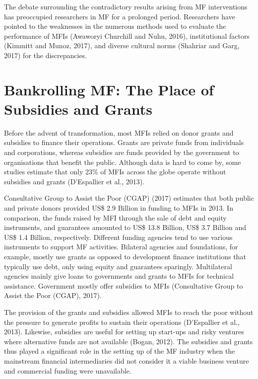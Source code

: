 \documentclass[a4paper, nobind]{templates/ociamthesis}
\begin{document}
The debate surrounding the contradictory results arising from MF interventions has preoccupied researchers in MF for a prolonged period. Researchers have pointed to the weaknesses in the numerous methods used to evaluate the performance of MFIs (Awaworyi Churchill and Nuhu, 2016), institutional factors (Kimmitt and Munoz, 2017), and diverse cultural norms (Shahriar and Garg, 2017) for the discrepancies.

\hypertarget{bankrolling-mf-the-place-of-subsidies-and-grants}{%
\section{Bankrolling MF: The Place of Subsidies and Grants}\label{bankrolling-mf-the-place-of-subsidies-and-grants}}

\noindent Before the advent of transformation, most MFIs relied on donor grants and subsidies to finance their operations. Grants are private funds from individuals and corporations, whereas subsidies are funds provided by the government to organisations that benefit the public. Although data is hard to come by, some studies estimate that only 23\% of MFIs across the globe operate without subsidies and grants (D'Espallier et al., 2013).

Consultative Group to Assist the Poor (CGAP) (2017) estimates that both public and private donors provided US\$ 2.9 Billion in funding to MFIs in 2013. In comparison, the funds raised by MFI through the sale of debt and equity instruments, and guarantees amounted to US\$ 13.8 Billion, US\$ 3.7 Billion and US\$ 1.4 Billion, respectively. Different funding agencies tend to use various instruments to support MF activities. Bilateral agencies and foundations, for example, mostly use grants as opposed to development finance institutions that typically use debt, only using equity and guarantees sparingly. Multilateral agencies mainly give loans to governments and grants to MFIs for technical assistance. Government mostly offer subsidies to MFIs (Consultative Group to Assist the Poor (CGAP), 2017).

The provision of the grants and subsidies allowed MFIs to reach the poor without the pressure to generate profits to sustain their operations (D'Espallier et al., 2013). Likewise, subsidies are useful for setting up start-ups and risky ventures where alternative funds are not available (Bogan, 2012). The subsidies and grants thus played a significant role in the setting up of the MF industry when the mainstream financial intermediaries did not consider it a viable business venture and commercial funding were unavailable.
\end{document}
